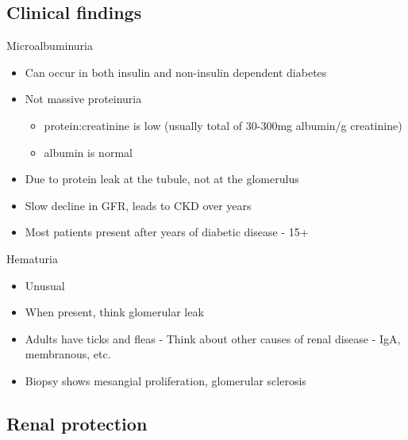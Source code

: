 \subsection{Clinical findings}\label{clinical-findings}

\begin{frame}{Microalbuminuria}

\begin{itemize}
\itemsep1pt\parskip0pt
\item
  Can occur in both insulin and non-insulin dependent diabetes
\item
  Not massive proteinuria

  \begin{itemize}
  \itemsep1pt\parskip0pt
  \item
    protein:creatinine is low (usually total of 30-300mg albumin/g
    creatinine)
  \item
    albumin is normal
  \end{itemize}
\item
  Due to protein leak at the tubule, not at the glomerulus
\item
  Slow decline in GFR, leads to CKD over years
\item
  Most patients present after years of diabetic disease - 15+
\end{itemize}

\end{frame}

\begin{frame}{Hematuria}

\begin{itemize}
\itemsep1pt\parskip0pt
\item
  Unusual
\item
  When present, think glomerular leak
\item
  Adults have ticks and fleas - Think about other causes of renal
  disease - IgA, membranous, etc.
\item
  Biopsy shows mesangial proliferation, glomerular sclerosis
\end{itemize}

\end{frame}

\subsection{Renal protection}\label{renal-protection}

